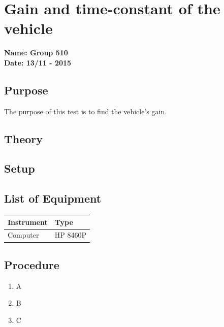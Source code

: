 \pagebreak
\section{Gain and time-constant of the vehicle} %
\textbf{Name: Group 510}\\
\textbf{Date: 13/11 - 2015}

\subsection{Purpose}
The purpose of this test is to find the vehicle's gain.

\subsection{Theory}

\subsection{Setup}

\subsection{List of Equipment}

\begin{table}[H]
\begin{tabular}{|p{10cm}|p{4cm}|}
\hline%
  \textbf{Instrument}                     &  \textbf{Type}       \\
\hline%
  Computer                                &  HP 8460P    \\
\hline %
\end{tabular}
\end{table}

\subsection{Procedure}

\begin{enumerate}
  \item A
  \item B
  \item C
\end{enumerate}

